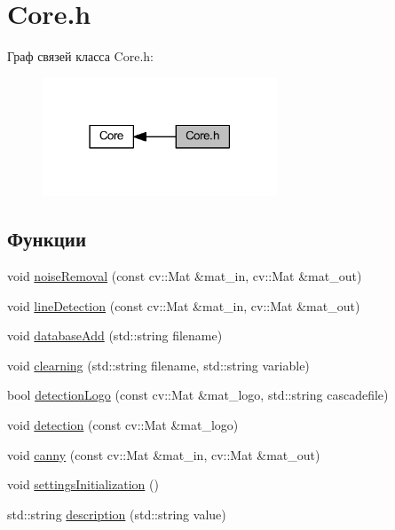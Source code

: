 \hypertarget{group__coreh}{}\section{Core.\+h}
\label{group__coreh}
Граф связей класса Core.\+h\+:
\nopagebreak
\begin{figure}[H]
\begin{center}
\leavevmode
\includegraphics[width=198pt]{group__coreh}
\end{center}
\end{figure}
\subsection*{Функции}
\begin{DoxyCompactItemize}
\item 
void \mbox{\hyperlink{group__coreh_ga438c92819ed0ad4fc2e187ed5f5a2e27}{noise\+Removal}} (const cv\+::\+Mat \&mat\+\_\+in, cv\+::\+Mat \&mat\+\_\+out)
\item 
void \mbox{\hyperlink{group__coreh_gaa7c37c22318217cd913a50800eb336a3}{line\+Detection}} (const cv\+::\+Mat \&mat\+\_\+in, cv\+::\+Mat \&mat\+\_\+out)
\item 
void \mbox{\hyperlink{group__coreh_ga5a4a30ca6128e13ce1ec6efaa23dd6c7}{database\+Add}} (std\+::string filename)
\item 
void \mbox{\hyperlink{group__coreh_gaebd676a1476aa4d75b280db8ae09d11c}{clearning}} (std\+::string filename, std\+::string variable)
\item 
bool \mbox{\hyperlink{group__coreh_gad1ae53e92ff9edcee7a9f35d2956ae57}{detection\+Logo}} (const cv\+::\+Mat \&mat\+\_\+logo, std\+::string cascadefile)
\item 
void \mbox{\hyperlink{group__coreh_ga0ef39a5ada0921b3abf8906957746b86}{detection}} (const cv\+::\+Mat \&mat\+\_\+logo)
\item 
void \mbox{\hyperlink{group__coreh_gaff2d42310702a0aab15af5ad62a59f2b}{canny}} (const cv\+::\+Mat \&mat\+\_\+in, cv\+::\+Mat \&mat\+\_\+out)
\item 
void \mbox{\hyperlink{group__coreh_ga242d25c7a9a1b7212bb890023c8131f5}{settings\+Initialization}} ()
\item 
std\+::string \mbox{\hyperlink{group__coreh_gaad0390ab7aa8f0cac1eee4492e919baf}{description}} (std\+::string value)
\end{DoxyCompactItemize}


